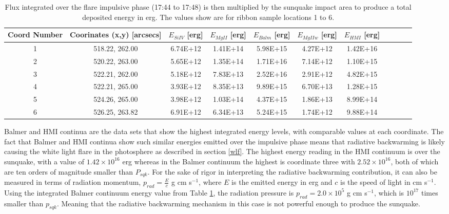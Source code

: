 \begin{table}[h]
\centering
\begin{tabular}{|c|c|c|c|c|c|c|c|c|c|c|}
Coord Number & Coorinates (x,y) [arcsecs] & $E_{Si IV}$ [erg] & $E_{Mg II}$ [erg] & $E_{Balm}$ [erg] & $E_{Mg II w}$ [erg] & $E_{HMI}$ [erg]\\
\hline
1 & 518.22, 262.00 & 6.74E+12 & 1.41E+14 & 5.98E+15 & 4.27E+12 & 1.42E+16\\
2 & 520.22, 263.00 & 5.65E+12 & 1.35E+14 & 1.71E+16 & 7.14E+12 & 1.10E+15\\
3 & 522.21, 262.00 & 5.18E+12 & 7.83E+13 & 2.52E+16 & 2.91E+12 & 4.82E+15\\
4 & 522.21, 265.00 & 3.93E+12 & 8.35E+13 & 9.89E+15 & 6.70E+13 & 1.28E+15\\
5 & 524.26, 265.00 & 3.98E+12 & 1.03E+14 & 4.37E+15 & 1.86E+13 & 8.99E+14\\
6 & 526.25, 263.82 & 6.91E+12 & 6.34E+13 & 5.24E+15 & 1.74E+12 & 9.88E+14\\
\end{tabular}
\caption{Flux integrated over the flare impulsive phase (17:44 to 17:48) is then multiplied by the sunquake impact area to produce a total deposited energy in erg. The values show are for ribbon sample locations 1 to 6.}\label{eimp}
\end{table}

Balmer and HMI continua are the data sets that show the highest integrated energy levels, with comparable values at each coordinate. The fact that Balmer and HMI continua show such similar energies emitted over the impulsive phase means that radiative backwarming is likely causing the white light flare in the photosphere as described in section \ref{wlf}. The highest energy reading in the HMI continuum is over the sunquake, with a value of $1.42{\times}10^{16}$ erg whereas in the Balmer continuum the highest is coordinate three with $2.52{\times}10^{16}$, both of which are ten orders of magnitude smaller than $P_{sqk}$. For the sake of rigor in interpreting the radiative backwarming contribution, it can also be measured in terms of radiation momentum, $p_{rad}=\frac{E}{c}$ g cm s$^{-1}$, where $E$ is the emitted energy in erg and $c$ is the speed of light in cm s$^{-1}$. Using the integrated Balmer continuum energy value from Table \ref{eimp}, the radiation pressure is $p_{rad} = 2.0{\times}10^{5}$ g cm s$^{-1}$, which is $10^{17}$ times smaller than $p_{sqk}$. Meaning that the radiative backwarming mechanism in this case is not powerful enough to produce the sunquake. \\ 

